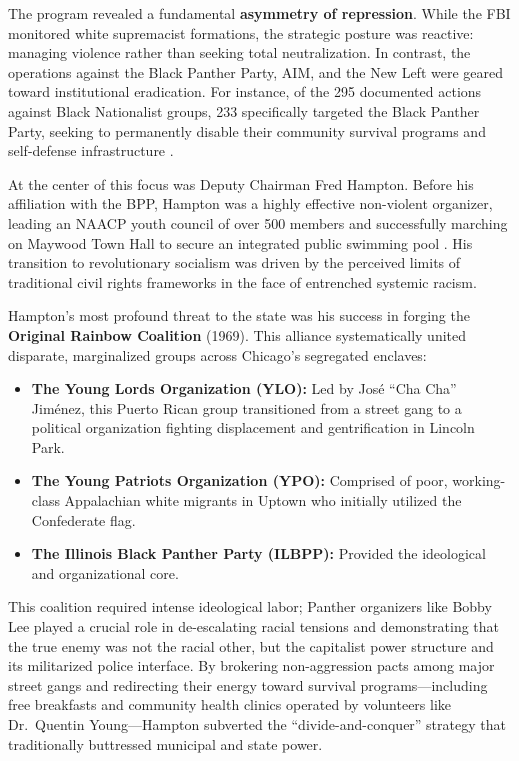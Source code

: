 \documentclass[12pt,openany]{book}
\begin{document}
The program revealed a fundamental \textbf{asymmetry of repression}. While the FBI monitored white supremacist formations, the strategic posture was reactive: managing violence rather than seeking total neutralization. In contrast, the operations against the Black Panther Party, AIM, and the New Left were geared toward institutional eradication. For instance, of the 295 documented actions against Black Nationalist groups, 233 specifically targeted the Black Panther Party, seeking to permanently disable their community survival programs and self-defense infrastructure \cite{fbi_cointelpro_vault}.

At the center of this focus was Deputy Chairman Fred Hampton. Before his affiliation with the BPP, Hampton was a highly effective non-violent organizer, leading an NAACP youth council of over 500 members and successfully marching on Maywood Town Hall to secure an integrated public swimming pool \cite{hampton_bio}. His transition to revolutionary socialism was driven by the perceived limits of traditional civil rights frameworks in the face of entrenched systemic racism.

Hampton's most profound threat to the state was his success in forging the \textbf{Original Rainbow Coalition} (1969). This alliance systematically united disparate, marginalized groups across Chicago's segregated enclaves:
\begin{itemize}
    \item \textbf{The Young Lords Organization (YLO):} Led by Jos\'{e} ``Cha Cha'' Jim\'{e}nez, this Puerto Rican group transitioned from a street gang to a political organization fighting displacement and gentrification in Lincoln Park.
    \item \textbf{The Young Patriots Organization (YPO):} Comprised of poor, working-class Appalachian white migrants in Uptown who initially utilized the Confederate flag.
    \item \textbf{The Illinois Black Panther Party (ILBPP):} Provided the ideological and organizational core.
\end{itemize}
This coalition required intense ideological labor; Panther organizers like Bobby Lee played a crucial role in de-escalating racial tensions and demonstrating that the true enemy was not the racial other, but the capitalist power structure and its militarized police interface. By brokering non-aggression pacts among major street gangs and redirecting their energy toward survival programs---including free breakfasts and community health clinics operated by volunteers like Dr.\ Quentin Young---Hampton subverted the ``divide-and-conquer'' strategy that traditionally buttressed municipal and state power.
\end{document}
